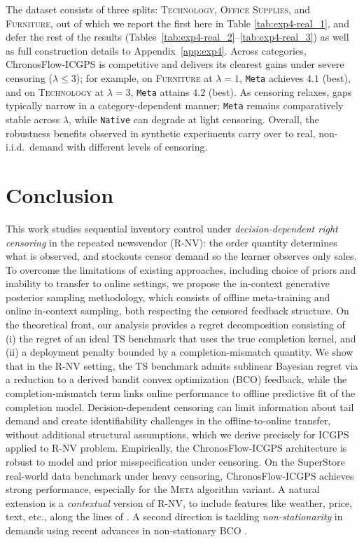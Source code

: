 \documentclass[11pt]{article}
\begin{document}
The dataset consists of three splits: \textsc{Technology}, \textsc{Office Supplies}, and \textsc{Furniture}, out of which we report the first here in Table \ref{tab:exp4-real_1}, and defer the rest of the results (Tables~\ref{tab:exp4-real_2}--\ref{tab:exp4-real_3}) as well as full construction details to Appendix~\ref{app:exp4}. Across categories, ChronosFlow-ICGPS is competitive and delivers its clearest gains under severe
censoring (\(\lambda\le 3\)); for example, on \textsc{Furniture} at \(\lambda=1\), \texttt{Meta} achieves
\(4.1\) (best), and on \textsc{Technology} at \(\lambda=3\), \texttt{Meta} attains
\(4.2\) (best). As censoring relaxes, gaps typically narrow in a category-dependent manner; \texttt{Meta} remains comparatively stable across \(\lambda\), while \texttt{Native} can degrade at light censoring. Overall, the robustness benefits observed in synthetic experiments carry over
to real, non-i.i.d.\ demand with different levels of censoring.









\section{Conclusion}
This work studies sequential inventory control under \emph{decision-dependent right censoring} in the repeated newsvendor (R-NV): the order quantity determines what is observed, and stockouts censor demand so the learner observes only sales. To overcome the limitations of existing approaches, including choice of priors and inability to transfer to online settings, we propose the in-context generative posterior sampling methodology, which consists of offline meta-training and online in-context sampling, both respecting the censored feedback structure. 
On the theoretical front, our analysis provides a regret decomposition consisting of (i) the regret of an ideal TS benchmark that uses the true completion kernel, and (ii) a deployment penalty bounded by a completion-mismatch quantity. We show that in the R-NV setting, the TS benchmark admits sublinear Bayesian regret via a reduction to a derived bandit convex optimization (BCO) feedback, while the completion-mismatch term links online performance to offline predictive fit of the completion model. Decision-dependent censoring can limit information about tail demand and create identifiability challenges in the offline-to-online transfer, without additional structural assumptions, which we derive precisely for ICGPS applied to R-NV problem. Empirically, the ChronosFlow-ICGPS architecture is robust to model and prior misspecification under censoring. On the SuperStore real-world data benchmark under heavy censoring, ChronosFlow-ICGPS achieves strong performance, especially for the \textsc{Meta} algorithm variant. A natural extension is a \emph{contextual} version of R-NV, to include features like weather, price, text, etc., along the lines of \cite{hssaine2024censored, zhang2025contextual}. A second direction is tackling \emph{non-stationarity} in demands \cite{DBLP:journals/ior/BesbesGZ15} using recent advances in non-stationary BCO \cite{JMLR:v22:20-763}.
\end{document}

